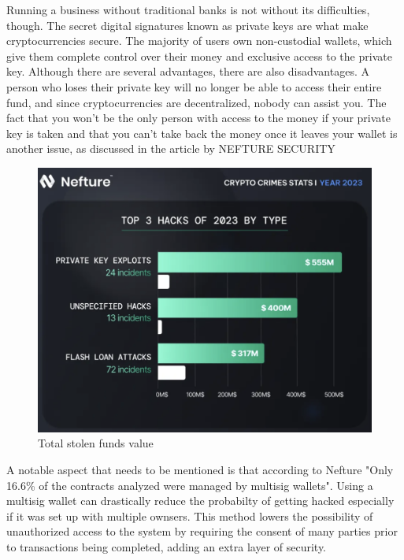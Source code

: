 \par Running a business without traditional banks is not without its difficulties, though. The secret digital signatures known as private keys are what make cryptocurrencies secure. The majority of users own non-custodial wallets, which give them complete control over their money and exclusive access to the private key. Although there are several advantages, there are also disadvantages. A person who loses their private key will no longer be able to access their entire fund, and since cryptocurrencies are decentralized, nobody can assist you. The fact that you won't be the only person with access to the money if your private key is taken and that you can't take back the money once it leaves your wallet is another issue, as discussed in the article by NEFTURE SECURITY \cite{Nefture2023Hack}
\begin{figure}[htbp]
	\centering
	\includegraphics[scale=0.45]{./figures/stolen-pk.png}
	\caption{Total stolen funds value}
\end{figure}

\par A notable aspect that needs to be mentioned is that according to Nefture "Only 16.6\% of the contracts analyzed were managed by multisig wallets"\cite{Nefture2023Hack}. Using a multisig wallet can drastically reduce the probabilty of getting hacked especially if it was set up with multiple ownsers. This method lowers the possibility of unauthorized access to the system by requiring the consent of many parties prior to transactions being completed, adding an extra layer of security.


